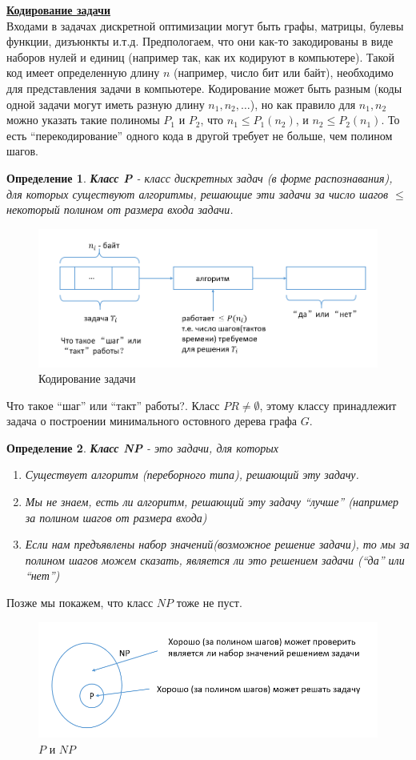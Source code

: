 \documentclass{article}
\newtheorem{definition}{Определение}
\numberwithin{example}{section}
\numberwithin{question}{section}
\numberwithin{Remark}{section}
\numberwithin{theorem}{section}
\numberwithin{definition}{section}
\numberwithin{proposition}{section}
\begin{document}
\underline{\textbf{Кодирование задачи}}\\
Входами в задачах дискретной оптимизации могут быть графы, матрицы, булевы функции, дизъюнкты и.т.д. Предпологаем, что они как-то закодированы в виде наборов нулей и единиц (например так, как их кодируют в компьютере). Такой код имеет определенную длину $n$ (например, число бит или байт), необходимо для представления задачи в компьютере. Кодирование может быть разным (коды одной задачи могут иметь разную длину $n_1,n_2,\ldots$), но как правило для $n_1,n_2$ можно указать такие полиномы $P_1$ и $P_2$, что $n_1\leqslant P_1(n_2)$, и $n_2\leqslant P_2(n_1)$. То есть ``перекодирование'' одного кода в другой требует не больше, чем полином шагов.
\begin{definition}
	\textbf{Класс P} - класс дискретных задач (в форме распознавания), для которых существуют алгоритмы, решающие эти задачи за число шагов $\leqslant$ некоторый полином от размера входа задачи.
\end{definition}
\begin{figure}[!htp]
	\centering
	\includegraphics[width=0.8\linewidth]{11-3}
	\caption{Кодирование задачи}
	\label{fig:11-3}
\end{figure}
Что такое ``шаг'' или ``такт'' работы?. Класс $PR\ne \emptyset$, этому классу принадлежит задача о построении минимального остовного дерева графа $G$.
\begin{definition}
	\textbf{Класс NP} - это задачи, для которых
	\begin{enumerate}
		\item Существует алгоритм (переборного типа), решающий эту задачу.
		\item Мы не знаем, есть ли алгоритм, решающий эту задачу ``лучше'' (например за полином шагов от размера входа)
		\item Если нам предъявлены набор значений(возможное решение задачи), то мы за полином шагов можем сказать, является ли это решением задачи (``да'' или ``нет'')
	\end{enumerate}
\end{definition}
Позже мы покажем, что класс $NP$ тоже не пуст.
\begin{figure}[!htp]
	\centering
	\includegraphics[width=0.7\linewidth]{11-4}
	\caption{$P$ и $NP$}
	\label{fig:11-4}
\end{figure}
\end{document}
